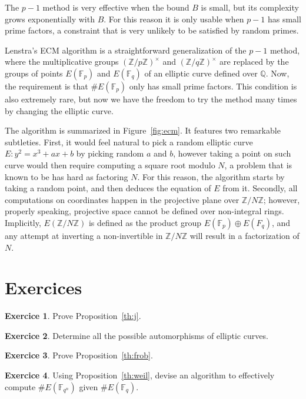 \documentclass[10pt]{article}
\theoremstyle{plain}
\theoremstyle{definition}
\newtheorem{exercice}{Exercice}[part]
\def\F{\ensuremath{\mathbb{F}}}
\begin{document}
The $p-1$ method is very effective when the bound $B$ is small, but
its complexity grows exponentially with $B$. %
For this reason it is only usable when $p-1$ has small prime factors,
a constraint that is very unlikely to be satisfied by random primes.

Lenstra's ECM algorithm is a straightforward generalization of the
$p-1$ method, where the multiplicative groups $(ℤ/pℤ)^{×}$ and
$(ℤ/qℤ)^{×}$ are replaced by the groups of points $E(\F_p)$ and
$E(\F_q)$ of an elliptic curve defined over $ℚ$. %
Now, the requirement is that $\#E(\F_p)$ only has small prime
factors. %
This condition is also extremely rare, but now we have the freedom to
try the method many times by changing the elliptic curve. %

The algorithm is summarized in Figure~\ref{fig:ecm}. %
It features two remarkable subtleties. %
First, it would feel natural to pick a random elliptic curve
$E:y^2=x^3+ax+b$ by picking random $a$ and $b$, however taking a point
on such curve would then require computing a square root modulo $N$, a
problem that is known to be has hard as factoring $N$. %
For this reason, the algorithm starts by taking a random point, and
then deduces the equation of $E$ from it. %
Secondly, all computations on coordinates happen in the projective
plane over $ℤ/Nℤ$; however, properly speaking, projective space cannot
be defined over non-integral rings. %
Implicitly, $E(ℤ/Nℤ)$ is defined as the product group
$E(\F_p)⊕E(F_q)$, and any attempt at inverting a non-invertible in
$ℤ/Nℤ$ will result in a factorization of $N$.

\section*{Exercices}

\begin{exercice}
  Prove Proposition~\ref{th:j}.
\end{exercice}

\begin{exercice}
  Determine all the possible automorphisms of elliptic curves.
\end{exercice}

\begin{exercice}
  Prove Proposition~\ref{th:frob}.
\end{exercice}

\begin{exercice}
  Using Proposition~\ref{th:weil}, devise an algorithm to effectively
  compute $\#E(\F_{q^n})$ given $\#E(\F_q)$.
\end{exercice}
\end{document}
